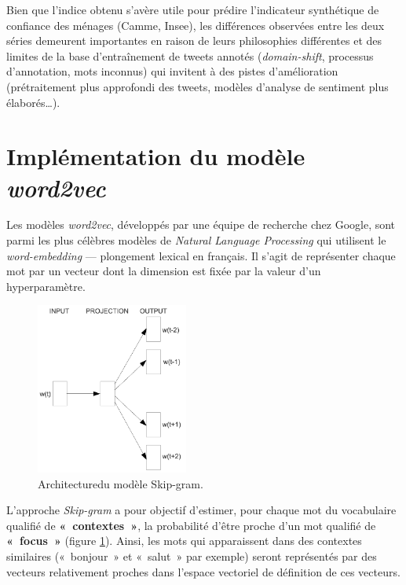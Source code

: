 \documentclass[10pt,french,french]{article}
\begin{document}
\begin{figure}[htb]

\end{figure}

Bien que l'indice obtenu s'avère utile pour prédire l'indicateur synthétique de confiance des ménages (Camme, Insee), les différences observées entre les deux séries demeurent importantes en raison de leurs philosophies différentes et des limites de la base d'entraînement de tweets annotés (\emph{domain-shift}, processus d'annotation, mots inconnus) qui invitent à des pistes d'amélioration (prétraitement plus approfondi des tweets, modèles d'analyse de sentiment plus élaborés\dots).

\newpage

\hypertarget{sec:word2vec}{%
\section{\texorpdfstring{Implémentation du modèle \emph{word2vec}}{Implémentation du modèle word2vec}}\label{sec:word2vec}}

Les modèles \emph{word2vec}, développés par une équipe de recherche chez Google, sont parmi les plus célèbres modèles de \emph{Natural Language Processing} qui utilisent le \emph{word-embedding} --- plongement lexical en français.
Il s'agit de représenter chaque mot par un vecteur dont la dimension est fixée par la valeur d'un hyperparamètre.

\begin{figure}
\includegraphics[width=5cm]{img/skip_gram.png}
\captionsetup{margin=0cm,format=hang,justification=justified}
\caption{Architecture\newline du modèle Skip-gram.}\label{fig:skipgram}
\end{figure}

L'approche \emph{Skip-gram} a pour objectif d'estimer, pour chaque mot du vocabulaire qualifié de \textbf{«~contextes~»}, la probabilité d'être proche d'un mot qualifié de \textbf{«~focus~»} (figure \ref{fig:skipgram}).
Ainsi, les mots qui apparaissent dans des contextes similaires («~bonjour~» et «~salut~» par exemple) seront représentés par des vecteurs relativement proches dans l'espace vectoriel de définition de ces vecteurs.
\end{document}
